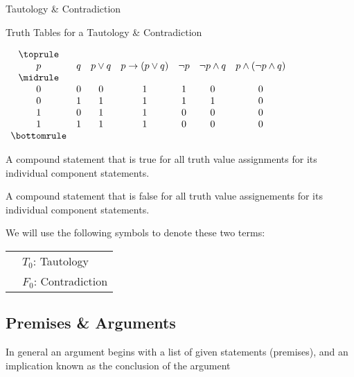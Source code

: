\documentclass[../../../../main.tex]{subfiles}
\begin{document}
\begin{table}[!htb]
    \caption{Tautology \& Contradiction}
    \centering
    \begin{subtable}{\linewidth}
        \centering
        \caption*{Truth Tables for a Tautology \& Contradiction}
        \label{tbl:tautology-contradiction}
        $\begin{array}{ *{7}{c} }
            \toprule \\
            p & q & p \lor q & p \to (p \lor q) & \neg p & \neg p \land q & p \land (\neg p \land q) \\
            \midrule \\
            0 & 0 & 0 & 1 & 1 & 0 & 0 \\
            0 & 1 & 1 & 1 & 1 & 1 & 0 \\
            1 & 0 & 1 & 1 & 0 & 0 & 0 \\
            1 & 1 & 1 & 1 & 0 & 0 & 0 \\
            \bottomrule
        \end{array}$
    \end{subtable}%
\end{table}

\begin{definition}[Tautology]
A compound statement that is true for all truth value assignments for its individual component statements.
\end{definition}

\begin{definition}[Contradiction]
A compound statement that is false for all truth value assignements for its individual component statements.
\end{definition}

We will use the following symbols to denote these two terms:

\newcommand\taut{T_0}
\newcommand\contra{F_0}

\begin{tabularx}{0.80\linewidth}{@{}lX}
    & $\taut$: Tautology \\
    & $\contra$: Contradiction
\end{tabularx}

\subsection{Premises \& Arguments}

In general an argument begins with a list of given statements (premises),
and an implication known as the conclusion of the argument
\end{document}
